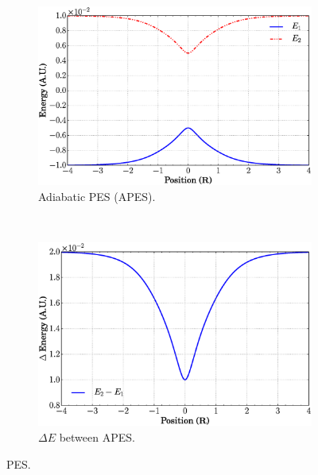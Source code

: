 \documentclass[xetex,mathserif,serif]{beamer}
\begin{document}
\begin{frame}
{\begin{figure}
\begin{subfigure}[t]{0.45\textwidth}
\includegraphics[width=\textwidth]{ascpes.eps}
\vspace{-0.2cm}
\caption{Adiabatic PES (APES).}
\label{f:apessc}
\end{subfigure}
~
\begin{subfigure}[t]{0.45\textwidth}
\centering
\includegraphics[width=\textwidth]{del_ascpes.eps}
\vspace{-0.2cm}
\caption{$ \Delta E$ between APES.}
\label{f:delapessc}
\end{subfigure}
\vspace{-0.35cm}
\caption{PES.}
\end{figure}
}
\end{frame}
\end{document}
